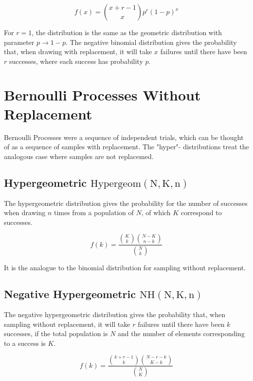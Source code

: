 \begin{equation}
f(x) = {x+r-1\choose x} p^r (1-p)^x
\end{equation} 

For $r=1$, the distribution is the same as the geometric distribution with parameter $p\rightarrow 1-p$. The negative binomial distribution gives the probability that, when drawing with replacement, it will take $x$ failures until there have been $r$ successes, where each success has probability $p$.

\section{Bernoulli Processes 	Without Replacement}
Bernoulli Processes were a sequence of independent trials, which can be thought of as a sequence of samples with replacement. The "hyper"- distributions treat the analogous case where samples are not replacemed.  

\subsection{Hypergeometric $\mathrm{Hypergeom(N,K,n)}$}
The hypergeometric distribution gives the probability for the number of successes when drawing $n$ times from a population of $N$, of which $K$ correspond to successes.

\begin{equation}
f(k) = \frac{{K \choose k}{ N-K \choose n-k}}{{N \choose k}}
\end{equation} 

It is the analogue to the binomial distribution for sampling without replacement.

\subsection{Negative Hypergeometric $\mathrm{NH(N,K,n)}$}
The negative hypergeometric distribution gives the probability that, when sampling without replacement, it will take $r$ failures until there have been $k$ successes, if the total population is $N$ and the number of elements corresponding to a success is $K$.

\begin{equation}
f(k) = \frac{{k+r-1\choose k}{N-r-k \choose K-k}}{{N\choose K}}
\end{equation}

